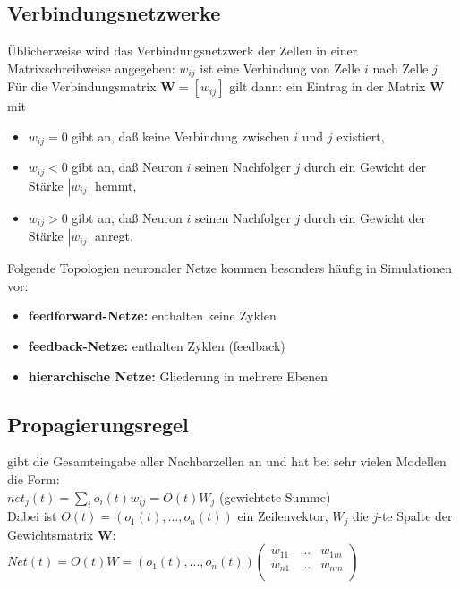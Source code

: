 \subsection{Verbindungsnetzwerke}
Üblicherweise wird das Verbindungsnetzwerk der Zellen in
einer Matrixschreibweise angegeben: $w_{ij}$ ist eine Verbindung von Zelle $i$ nach Zelle $j$. Für die Verbindungsmatrix $\textbf{W} = [w_{ij}]$ gilt dann: ein Eintrag in der Matrix $\textbf{W}$ mit
\begin{itemize}
\item $w_{ij} = 0$ gibt an, daß keine Verbindung zwischen $i$ und $j$ existiert,
\item $w_{ij} < 0$ gibt an, daß Neuron $i$ seinen Nachfolger $j$ durch ein Gewicht der
Stärke $|w_{ij}|$ hemmt,
\item $w_{ij} > 0$ gibt an, daß Neuron $i$ seinen Nachfolger $j$ durch ein Gewicht der
Stärke $|w_{ij}|$ anregt.
\end{itemize}

Folgende Topologien neuronaler Netze kommen besonders häufig in Simulationen vor:
\begin{itemize}
\item \textbf{feedforward-Netze:} enthalten keine Zyklen
\item \textbf{feedback-Netze:} enthalten Zyklen (feedback)
\item \textbf{hierarchische Netze:} Gliederung in mehrere Ebenen
\end{itemize}

\subsection{Propagierungsregel}
gibt die Gesamteingabe aller Nachbarzellen an und hat bei sehr vielen Modellen die Form:\\
$net_j(t) = \sum_i o_i(t)w_{ij} = O(t)W_j$ (gewichtete Summe)\\
Dabei ist $O(t) = (o_1(t),...,o_n(t))$ ein Zeilenvektor, $W_j$ die $j$-te Spalte der Gewichtsmatrix $\textbf{W}$:\\
$Net(t) = O(t)W =  (o_1(t),...,o_n(t))\begin{pmatrix}
w_{11} & ... & w_{1m}\\
w_{n1} & ... & w_{nm}\\
\end{pmatrix}$

